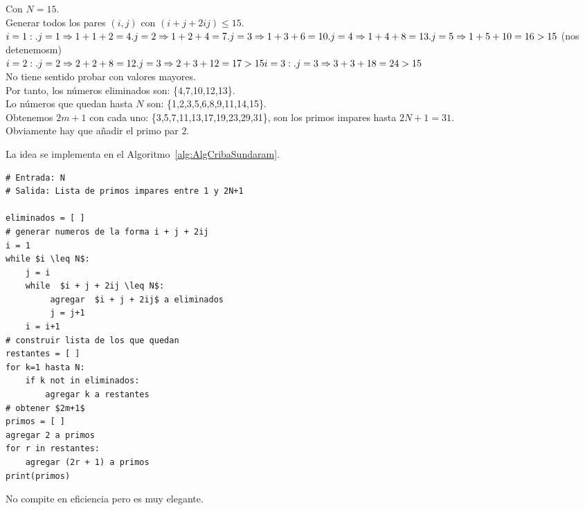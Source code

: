 \begin{ejemplo}
Con $N=15$. \\  
Generar todos los pares $(i,j)$ con $(i+j+2ij) \leq 15$.\\
$i=1: \\
. j=1 \Rightarrow 1+1+2=4   \\
. j=2 \Rightarrow 1+2+4=7   \\ 
. j=3 \Rightarrow 1+3+6=10   \\
. j=4 \Rightarrow 1+4+8=13   \\ 
. j=5 \Rightarrow 1+5+10=16 > 15$  (nos detenemosm)  \\
$i=2:  
. j=2 \Rightarrow 2+2+8=12   \\
. j=3 \Rightarrow 2+3+12=17 > 15 \\ 
i=3:  \\
. j=3 \Rightarrow 3+3+18=24 > 15$ \\
No tiene sentido probar con valores mayores. \\
Por tanto, los números eliminados son: \{4,7,10,12,13\}. \\
Lo números que quedan hasta $N$ son: \{1,2,3,5,6,8,9,11,14,15\}.\\
Obtenemos $2m+1$ con cada uno: \{3,5,7,11,13,17,19,23,29,31\}, son los primos impares hasta $2N+1 = 31$.\\
Obviamente hay que añadir el primo par $2$.
\end{ejemplo}

La idea se implementa en el Algoritmo~\ref{alg:AlgCribaSundaram}.

\begin{lstlisting}[caption={Criba de Sundaram}, label={alg:AlgCribaSundaram}, mathescape=true]
# Entrada: N
# Salida: Lista de primos impares entre 1 y 2N+1

eliminados = [ ]
# generar numeros de la forma i + j + 2ij
i = 1
while $i \leq N$:
    j = i
    while  $i + j + 2ij \leq N$:
         agregar  $i + j + 2ij$ a eliminados
         j = j+1
    i = i+1
# construir lista de los que quedan
restantes = [ ]
for k=1 hasta N:
    if k not in eliminados:
        agregar k a restantes
# obtener $2m+1$
primos = [ ]
agregar 2 a primos  
for r in restantes:
    agregar (2r + 1) a primos
print(primos)
\end{lstlisting}

No compite en eficiencia pero es muy elegante.

